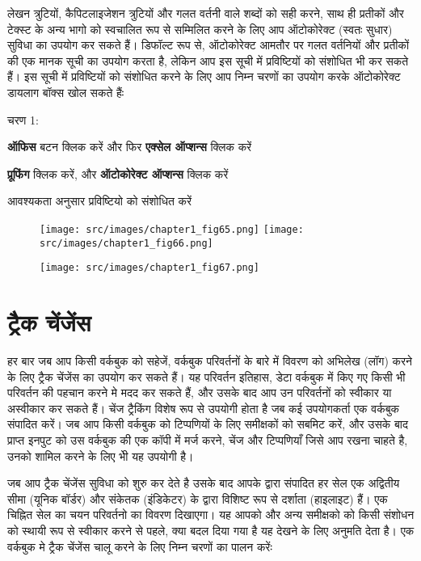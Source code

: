 लेखन त्रुटियों, कैपिटलाइजेशन त्रुटियों और गलत वर्तनी वाले शब्दों को सही करने, साथ ही प्रतीकों और टेक्स्ट के अन्य भागो को स्वचालित रूप से सम्मिलित करने के लिए आप ऑटोकोरेक्ट  (स्वतः सुधार) सुविधा का उपयोग कर सकते हैं। डिफॉल्ट रूप से, ऑटोकोरेक्ट आमतौर पर गलत वर्तनियों और प्रतीकों की एक मानक सूची का उपयोग करता है, लेकिन आप इस सूची में प्रविष्टियों को संशोधित भी कर सकते हैं। इस सूची में प्रविष्टियों को संशोधित करने के लिए आप निम्न चरणों का उपयोग करके ऑटोकोरेक्ट डायलाग बॉक्स खोल सकते हैंः

\begin{descriptionSimple}{चरण 1:}
\item[चरण 1] \textbf{ऑफिस} बटन क्लिक करें और फिर \textbf{एक्सेल ऑप्शन्स} क्लिक करें
\item[चरण 2] \textbf{प्रूफिंग} क्लिक करें, और \textbf{ऑटोकोरेक्ट ऑप्शन्स} क्लिक करें
\item[चरण 3] आवश्यकता अनुसार प्रविष्टियो को संशोधित करें
\end{descriptionSimple}
\begin{figure}[H]
\centering
\texttt{[image: src/images/chapter1\_fig65.png]}\qquad
\texttt{[image: src/images/chapter1\_fig66.png]}
\end{figure}
\begin{figure}[H]
\centering
\texttt{[image: src/images/chapter1\_fig67.png]}
\end{figure}												

\section{ट्रैक चेंजेंस}\label{id-1.41}

हर बार जब आप किसी वर्कबुक को सहेजें, वर्कबुक परिवर्तनों के बारे में विवरण को अभिलेख (लॉग) करने के लिए ट्रैक चेंजेंस का उपयोग कर सकते हैं। यह परिवर्तन इतिहास, डेटा वर्कबुक में किए गए किसी भी परिवर्तन की पहचान करने मे मदद कर सकते हैं, और उसके बाद आप उन परिवर्तनों को स्वीकार या अस्वीकार कर सकते हैं। चेंज ट्रैकिंग विशेष रूप से उपयोगी होता है जब कई उपयोगकर्ता एक वर्कबुक संपादित करें। जब आप किसी वर्कबुक को टिप्पणियों के लिए समीक्षकों को सबमिट करें, और उसके बाद प्राप्त इनपुट को उस वर्कबुक की एक कॉपी में मर्ज करने, चेंज और टिप्पणियाँ जिसे आप रखना चाहते है, उनको शामिल करने के लिए भीे यह उपयोगी है।


जब आप ट्रैक चेंजेंस सुविधा को शुरु कर देते है उसके बाद आपके द्वारा संपादित हर सेल एक अद्वितीय सीमा (यूनिक बॉर्डर) और संकेतक (इंडिकेटर) के द्वारा विशिष्ट रूप से दर्शाता (हाइलाइट) हैं। एक चिह्नित सेल का चयन परिवर्तनो का विवरण दिखाएगा। यह आपको और अन्य समीक्षको को किसी संशोधन को स्थायी रूप से स्वीकार करने से पहले, क्या बदल दिया गया है यह देखने के लिए अनुमति देता है। एक वर्कबुक मे ट्रैक चेंजेंस चालू करने के लिए निम्न चरणों का पालन करेंः
				
